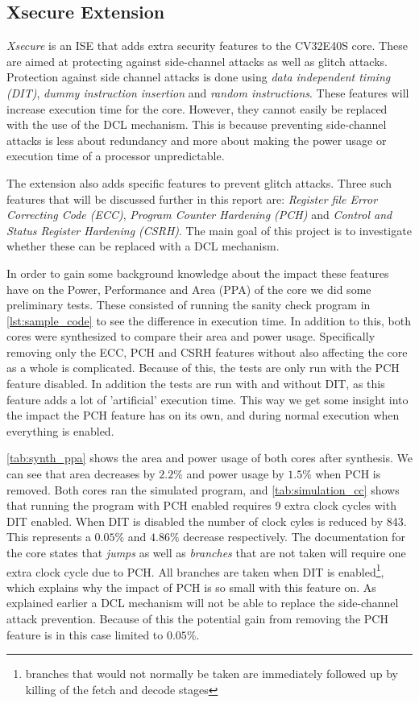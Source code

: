 \subsection{Xsecure Extension}
\label{sec:xsecure}

\textit{Xsecure} is an ISE that adds extra security features to the CV32E40S core. These are aimed at protecting against side-channel attacks as well as glitch attacks. Protection against side channel attacks is done using \textit{data independent timing (DIT)}, \textit{dummy instruction insertion} and \textit{random instructions}\cite{cv32e40s_manual}. These features will increase execution time for the core. However, they cannot easily be replaced with the use of the DCL mechanism. This is because preventing side-channel attacks is less about redundancy and more about making the power usage or execution time of a processor unpredictable. 

The extension also adds specific features to prevent glitch attacks. Three such features that will be discussed further in this report are: \textit{Register file Error Correcting Code (ECC)}, \textit{Program Counter Hardening (PCH)} and \textit{Control and Status Register Hardening (CSRH)}. The main goal of this project is to investigate whether these can be replaced with a DCL mechanism. 

In order to gain some background knowledge about the impact these features have on the Power, Performance and Area (PPA) of the core we did some preliminary tests. These consisted of running the sanity check program in \autoref{lst:sample_code} to see the difference in execution time. In addition to this, both cores were synthesized to compare their area and power usage. Specifically removing only the ECC, PCH and CSRH features without also affecting the core as a whole is complicated. Because of this, the tests are only run with the PCH feature disabled. In addition the tests are run with and without DIT, as this feature adds a lot of 'artificial' execution time. This way we get some insight into the impact the PCH feature has on its own, and during normal execution when everything is enabled. 

\autoref{tab:synth_ppa} shows the area and power usage of both cores after synthesis. We can see that area decreases by $2.2\%$ and power usage by $1.5\%$ when PCH is removed. Both cores ran the simulated program, and \autoref{tab:simulation_cc} shows that running the program with PCH enabled requires 9 extra clock cycles with DIT enabled. When DIT is disabled the number of clock cyles is reduced by 843. This represents a $0.05\%$ and $4.86\%$ decrease respectively. The documentation for the core states that \textit{jumps} as well as \textit{branches} that are not taken will require one extra clock cycle due to PCH. All branches are taken when DIT is enabled\footnote{branches that would not normally be taken are immediately followed up by killing of the fetch and decode stages}, which explains why the impact of PCH is so small with this feature on\cite{cv32e40s_manual}. As explained earlier a DCL mechanism will not be able to replace the side-channel attack prevention. Because of this the potential gain from removing the PCH feature is in this case limited to $0.05\%$. 

